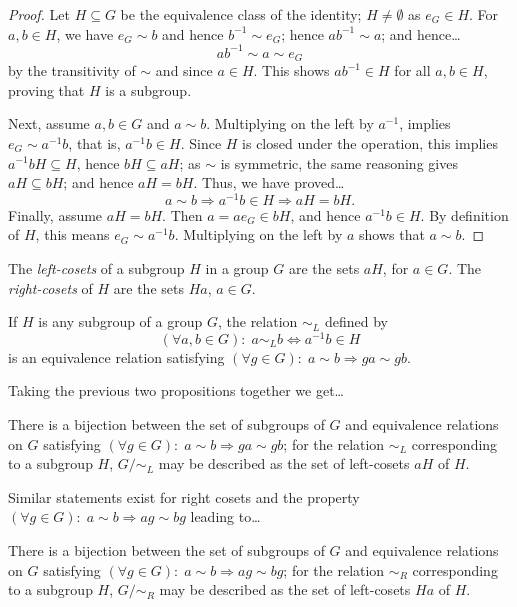 \begin{proof}
Let $H \subseteq G$ be the equivalence class of the identity; $H \neq \emptyset$ as $e_G \in H$. For $a,b \in H$,
we have $e_G \sim b$ and hence $b^{-1} \sim e_G$; hence $ab^{-1} \sim a$; and hence\dots
$$ab^{-1} \sim a \sim e_G$$
by the transitivity of $\sim$ and since $a \in H$. This shows $ab^{-1} \in H$ for all $a,b \in H$, proving that $H$ is a subgroup.

Next, assume $a,b \in G$ and $a \sim b$. Multiplying on the left by $a^{-1}$, implies $e_G \sim a^{-1}b$, that is, $a^{-1}b \in H$. Since $H$ is closed
under the operation, this implies $a^{-1}bH \subseteq H$, hence $bH \subseteq aH$; as $\sim$ is symmetric, the same reasoning gives $aH \subseteq bH$; and
hence $aH = bH$. Thus, we have proved\dots
$$a \sim b \Rightarrow a^{-1}b \in H \Rightarrow aH = bH.$$
Finally, assume $aH = bH$. Then $a = ae_G \in bH$, and hence $a^{-1}b \in H$. By definition of $H$, this means $e_G \sim a^{-1}b$. Multiplying on the left by $a$
shows that $a \sim b$.
\end{proof}

\noindent The \emph{left-cosets} of a subgroup $H$ in a group $G$ are the sets $aH$, for $a \in G$. The \emph{right-cosets}
of $H$ are the sets $Ha$, $a \in G$.

\begin{proposition}
If $H$ is any subgroup of a group $G$, the relation $\sim_L$ defined by
$$(\forall a,b \in G) : \; a \sim_L b \Leftrightarrow a^{-1}b \in H$$
is an equivalence relation satisfying $(\forall g \in G) : \; a \sim b \Rightarrow ga \sim gb$.
\end{proposition}

\noindent Taking the previous two propositions together we get\dots

\begin{proposition}
There is a bijection between the set of subgroups of $G$ and equivalence relations on $G$ satisfying $(\forall g \in G) : \; a \sim b \Rightarrow ga \sim gb$;
for the relation $\sim_L$ corresponding to a subgroup $H$, $G/\sim_L$ may be described as the set of left-cosets $aH$ of $H$.
\end{proposition}

\noindent Similar statements exist for right cosets and the property $(\forall g \in G) : \; a \sim b \Rightarrow ag \sim bg$ leading to\dots
\begin{proposition}
There is a bijection between the set of subgroups of $G$ and equivalence relations on $G$ satisfying $(\forall g \in G) : \; a \sim b \Rightarrow ag \sim bg$;
for the relation $\sim_R$ corresponding to a subgroup $H$, $G/\sim_R$ may be described as the set of left-cosets $Ha$ of $H$.
\end{proposition}

